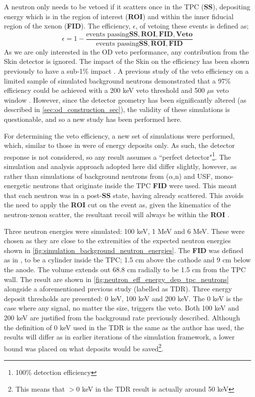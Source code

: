 \par
A neutron only needs to be vetoed if it scatters once in the TPC (\textbf{SS}), depositing energy which is in the region of interest (\textbf{ROI}) and within the inner fiducial region of the xenon (\textbf{FID}).
The efficiency, $\epsilon$, of vetoing these events is defined as;
\begin{equation}
    \epsilon = 1 - \frac{\text{events passing}\mathbf{SS, ROI, FID, Veto}}{\text{events passing}\mathbf{SS, ROI, FID}}
    \label{eq:neutron_efficiency}
\end{equation}
As we are only interested in the OD veto performance, any contribution from the Skin detector is ignored.
The impact of the Skin on the efficiency has been shown previously to have a sub-1\% impact \cite{sallyshaw_thesis_ref}.
A previous study of the veto efficiency on a limited sample of simulated background neutrons demonstrated that a 97\% efficiency could be achieved with a 200 keV veto threshold and 500 $\mu$s veto window \cite{LZ_TechnicalDesignReview_ref}.
However, since the detector geometry has been significantly altered (as described in \autoref{sec:od_construction_sec}), the validity of these simulations is questionable, and so a new study has been performed here.
\par
For determining the veto efficiency, a new set of simulations were performed, which, similar to those in \cite{LZ_TechnicalDesignReview_ref} were of energy deposits only.
As such, the detector response is not considered, so any result assumes a ``perfect detector"\footnote{100\% detection efficiency}.
The simulation and analysis approach adopted here did differ slightly, however, as rather than simulations of background neutrons from ($\alpha$,n) and USF, mono-energetic neutrons that originate inside the TPC \textbf{FID} were used.
This meant that each neutron was in a post-\textbf{SS} state, having already scattered.
This avoids the need to apply the \textbf{ROI} cut on the event as, given the kinematics of the neutron-xenon scatter, the resultant recoil will always be within the \textbf{ROI} \cite{xenon100_neutrons_ref}.
\par
Three neutron energies were simulated: 100 keV, 1 MeV and 6 MeV.
These were chosen as they are close to the extremities of the expected neutron energies shown in \autoref{fig:simulation_background_neutron_energies}.
The \textbf{FID} was defined as in \cite{LZ_TechnicalDesignReview_ref}, to be a cylinder inside the TPC; 1.5 cm above the cathode and 9 cm below the anode.
The volume extends out 68.8 cm radially to be 1.5 cm from the TPC wall.
The result are shown in \autoref{fig:neutron_eff_energy_dep_tpc_neutrons} alongside a aforementioned previous study (labelled as TDR).
Three energy deposit thresholds are presented: 0 keV, 100 keV and 200 keV.
The 0 keV is the case where any signal, no matter the size, triggers the veto.
Both 100 keV and 200 keV are justified from the background rate previously described.
Although the definition of 0 keV used in the TDR is the same as the author has used, the results will differ as in earlier iterations of the simulation framework, a lower bound was placed on what deposits would be saved\footnote{This means that $>$0 keV in the TDR result is actually around 50 keV}.

